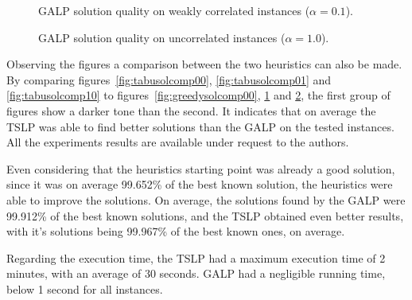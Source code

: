 \figspaces
\begin{figure}[H]
  \centering
  \resizebox{\columnwidth}{!}{%
    \subfloat[1 resource]{} 
    \subfloat[2 resources]{}
    \subfloat[4 resources]{}
  }
  \caption{GALP solution quality on weakly correlated instances ($\alpha = 0.1$).}
  \label{fig:greedysolcomp01}
\end{figure}

\figspaces
\begin{figure}[H]
  \centering
  \resizebox{\columnwidth}{!}{%
    \subfloat[1 resource]{} 
    \subfloat[2 resources]{}
    \subfloat[4 resources]{}
  }
  \caption{GALP solution quality on uncorrelated instances ($\alpha = 1.0$).}
  \label{fig:greedysolcomp10}
\end{figure}

Observing the figures a comparison between the two heuristics can also be made.
By comparing figures~\ref{fig:tabusolcomp00}, \ref{fig:tabusolcomp01} and \ref{fig:tabusolcomp10} to 
figures~\ref{fig:greedysolcomp00}, \ref{fig:greedysolcomp01} and \ref{fig:greedysolcomp10}, the first group 
of figures show a darker tone than the second. It indicates that on average the TSLP was able to find better
solutions than the GALP on the tested instances. All the experiments results are available under request to the authors.

Even considering that the heuristics starting point was already a good solution, since it was on average
99.652\% of the best known solution, the heuristics were able to improve the solutions. On average, 
the solutions found by the GALP were 99.912\% of the best known solutions, and the TSLP obtained 
even better results, with it's solutions being 99.967\% of the best known ones, on average.

Regarding the execution time, the TSLP had a maximum execution time of 2 minutes, with an average of 30 seconds.
GALP had a negligible running time, below 1 second for all instances.
